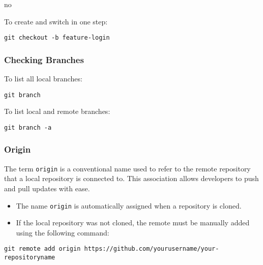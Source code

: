no\documentclass{article}
\newcommand{\codecmd}[1]{\textcolor[rgb]{0,0.5,0}{\texttt{#1}}}
\begin{document}
\noindent To create and switch in one step:

\begin{tcolorbox}[colback=mintgreen, colframe=green!40!black, boxrule=0.5pt, sharp corners]
\begin{verbatim}
git checkout -b feature-login
\end{verbatim}
\end{tcolorbox}

\subsubsection{Checking Branches}

To list all local branches:

\begin{tcolorbox}[colback=mintgreen, colframe=green!40!black, boxrule=0.5pt, sharp corners]
\begin{verbatim}
git branch
\end{verbatim}
\end{tcolorbox}

\noindent To list local and remote branches:

\begin{tcolorbox}[colback=mintgreen, colframe=green!40!black, boxrule=0.5pt, sharp corners]
\begin{verbatim}
git branch -a
\end{verbatim}
\end{tcolorbox}

\subsubsection{Origin}

The term \codecmd{origin} is a conventional name used to refer to the remote repository that a local repository is connected to. This association allows developers to push and pull updates with ease.

\begin{itemize}
    \item The name \codecmd{origin} is automatically assigned when a repository is cloned.
    \item If the local repository was not cloned, the remote must be manually added using the following command:
\end{itemize}

\begin{tcolorbox}[colback=mintgreen, colframe=green!40!black, boxrule=0.5pt, sharp corners]
\begin{verbatim}
git remote add origin https://github.com/yourusername/your-repositoryname
\end{verbatim}
\end{tcolorbox}
\end{document}
